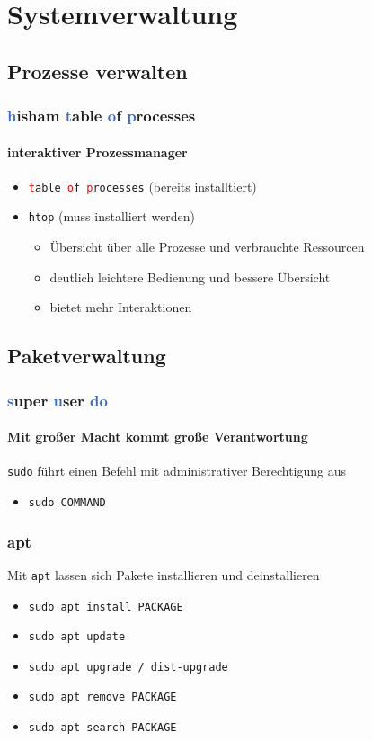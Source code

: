 \documentclass[12pt,utf8]{beamer}
\begin{document}
\begin{frame}
	\Huge\centering{$|$~~~$>$}
\end{frame}

\begin{frame}
\Huge\centering{\&}
\end{frame}

\section{Systemverwaltung}
\subsection{Prozesse verwalten}
\begin{frame}
\frametitle{\textcolor{highlight}{h}isham \textcolor{highlight}{t}able \textcolor{highlight}{o}f \textcolor{highlight}{p}rocesses}
\framesubtitle{interaktiver Prozessmanager}
\begin{itemize}
	\item \texttt{\textcolor{red}{t}able \textcolor{red}{o}f \textcolor{red}{p}rocesses} (bereits installtiert)
	\item \texttt{htop} (muss installiert werden)
	\begin{itemize}[<+->]
		\item {\scriptsize Übersicht über alle Prozesse und verbrauchte Ressourcen}
		\item {\scriptsize deutlich leichtere Bedienung und bessere Übersicht}
		\item {\scriptsize bietet mehr Interaktionen}
	\end{itemize}
\end{itemize}
\end{frame}

\subsection{Paketverwaltung}
\begin{frame}
	\frametitle{\textcolor{highlight}{s}uper \textcolor{highlight}{u}ser \textcolor{highlight}{do}}
	\framesubtitle{Mit großer Macht kommt große Verantwortung}
	\texttt{sudo} führt einen Befehl mit administrativer Berechtigung aus
	\begin{itemize}
		\item \texttt{sudo COMMAND}
	\end{itemize}
\end{frame}

\begin{frame}
	\frametitle{apt}
	Mit \texttt{apt} lassen sich Pakete installieren und deinstallieren
	\begin{itemize}
		\item \texttt{sudo apt install PACKAGE}
		\item \texttt{sudo apt update}
		\item \texttt{sudo apt upgrade / dist-upgrade}
		\item \texttt{sudo apt remove PACKAGE}
		\item \texttt{sudo apt search PACKAGE}
	\end{itemize}
\end{frame}
\end{document}
